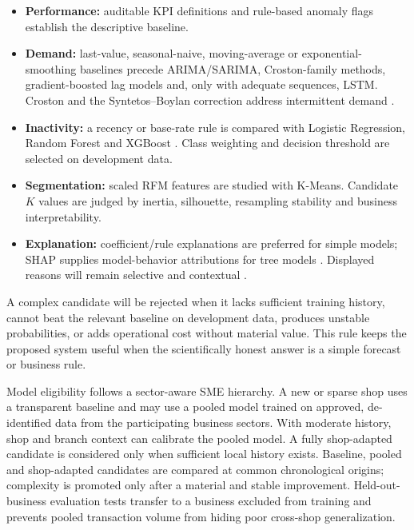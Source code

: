 \begin{itemize}
  \item \textbf{Performance:} auditable KPI definitions and rule-based anomaly
  flags establish the descriptive baseline.
  \item \textbf{Demand:} last-value, seasonal-naive, moving-average or
  exponential-smoothing baselines precede ARIMA/SARIMA, Croston-family methods,
  gradient-boosted lag models and, only with adequate sequences, LSTM. Croston
  and the Syntetos--Boylan correction address intermittent demand
  \cite{croston1972intermittent,syntetos2005intermittent}.
  \item \textbf{Inactivity:} a recency or base-rate rule is compared with
  Logistic Regression, Random Forest \cite{breiman2001rf} and XGBoost
  \cite{chen2016xgboost}. Class weighting and decision threshold are selected on
  development data.
  \item \textbf{Segmentation:} scaled RFM features are studied with K-Means.
  Candidate $K$ values are judged by inertia, silhouette, resampling stability
  and business interpretability.
  \item \textbf{Explanation:} coefficient/rule explanations are preferred for
  simple models; SHAP supplies model-behavior attributions for tree models
  \cite{lundberg2017shap}. Displayed reasons will remain
  selective and contextual \cite{miller2019explanation}.
\end{itemize}

A complex candidate will be rejected when it lacks sufficient training history,
cannot beat the relevant baseline on development data, produces unstable
probabilities, or adds operational cost without material value. This rule keeps
the proposed system useful when the scientifically honest answer is a simple
forecast or business rule.

Model eligibility follows a sector-aware SME hierarchy. A new or sparse shop
uses a transparent baseline and may use a pooled model trained on approved,
de-identified data from the participating business sectors. With moderate
history, shop and branch context can calibrate the pooled model. A fully
shop-adapted candidate is considered only when sufficient local history exists.
Baseline, pooled and shop-adapted candidates are compared at common
chronological origins; complexity is promoted only after a material and stable
improvement. Held-out-business evaluation tests transfer to a business excluded
from training and prevents pooled transaction volume from hiding poor
cross-shop generalization.

